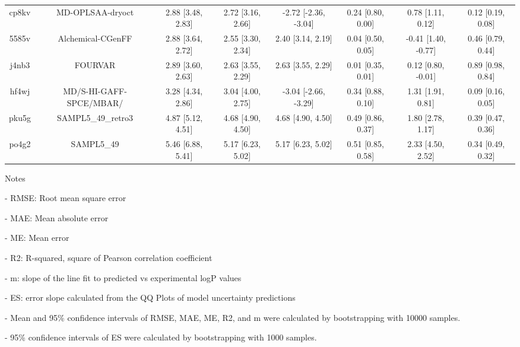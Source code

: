 \documentclass{article}
\begin{document}
\begin{center}
\begin{longtable}{|cccccccc|}
 cp8kv &                                   MD-OPLSAA-dryoct &  2.88 [3.48, 2.83] &  2.72 [3.16, 2.66] &  -2.72 [-2.36, -3.04] &  0.24 [0.80, 0.00] &     0.78 [1.11, 0.12] &     0.12 [0.19, 0.08] \\
 5585v &                                  Alchemical-CGenFF &  2.88 [3.64, 2.72] &  2.55 [3.30, 2.34] &     2.40 [3.14, 2.19] &  0.04 [0.50, 0.05] &   -0.41 [1.40, -0.77] &     0.46 [0.79, 0.44] \\
 j4nb3 &                                            FOURVAR &  2.89 [3.60, 2.63] &  2.63 [3.55, 2.29] &     2.63 [3.55, 2.29] &  0.01 [0.35, 0.01] &    0.12 [0.80, -0.01] &     0.89 [0.98, 0.84] \\
 hf4wj &                            MD/S-HI-GAFF-SPCE/MBAR/ &  3.28 [4.34, 2.86] &  3.04 [4.00, 2.75] &  -3.04 [-2.66, -3.29] &  0.34 [0.88, 0.10] &     1.31 [1.91, 0.81] &     0.09 [0.16, 0.05] \\
 pku5g &                                 SAMPL5\_49\_retro3 &  4.87 [5.12, 4.51] &  4.68 [4.90, 4.50] &     4.68 [4.90, 4.50] &  0.49 [0.86, 0.37] &     1.80 [2.78, 1.17] &     0.39 [0.47, 0.36] \\
 po4g2 &                                         SAMPL5\_49 &  5.46 [6.88, 5.41] &  5.17 [6.23, 5.02] &     5.17 [6.23, 5.02] &  0.51 [0.85, 0.58] &     2.33 [4.50, 2.52] &     0.34 [0.49, 0.32] \\
\end{longtable}
\end{center}

Notes

- RMSE: Root mean square error

- MAE: Mean absolute error

- ME: Mean error

- R2: R-squared, square of Pearson correlation coefficient

- m: slope of the line fit to predicted vs experimental logP values

- ES: error slope calculated from the QQ Plots of model uncertainty predictions

- Mean and 95\% confidence intervals of RMSE, MAE, ME, R2, and m were calculated by bootstrapping with 10000 samples.

- 95\% confidence intervals of ES were calculated by bootstrapping with 1000 samples.\end{document}
\end{document}
